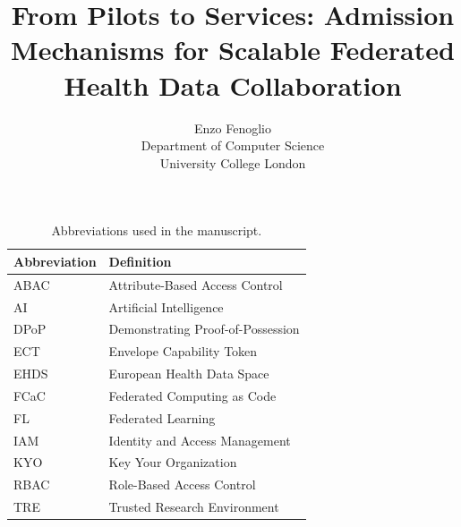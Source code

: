 \documentclass[twoside,11pt]{article}
\begin{document}
\title{From Pilots to Services: Admission Mechanisms for Scalable Federated Health 
Data Collaboration }

\author{\name Enzo Fenoglio   \\
       \addr Department of Computer Science\\
       University College London  
 }

\editor{}

\maketitle

\begin{table}[htbp]
\centering
\caption{Abbreviations used in the manuscript.}
\label{tab:abbreviations}
\small

\begin{tabularx}{\textwidth}{
    >{\raggedright\arraybackslash}p{2.5cm}
    >{\raggedright\arraybackslash}X
}
\toprule
\textbf{Abbreviation} &
\textbf{Definition} \\
\midrule

ABAC & Attribute-Based Access Control \\

AI & Artificial Intelligence \\

DPoP & Demonstrating Proof-of-Possession \\

ECT & Envelope Capability Token \\

EHDS & European Health Data Space \\

FCaC & Federated Computing as Code \\

FL & Federated Learning \\

IAM & Identity and Access Management \\

KYO & Key Your Organization \\

RBAC & Role-Based Access Control \\

TRE & Trusted Research Environment \\

\bottomrule
\end{tabularx}
\end{table}
\end{document}

